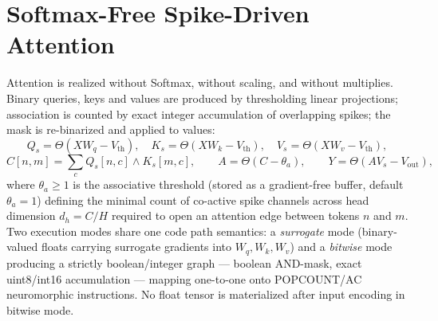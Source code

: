 \documentclass[11pt]{article}
\begin{document}
\section{Softmax-Free Spike-Driven Attention}
Attention is realized without Softmax, without scaling, and without
multiplies. Binary queries, keys and values are produced by thresholding
linear projections; association is counted by exact integer accumulation of
overlapping spikes; the mask is re-binarized and applied to values:
\begin{equation}
Q_s = \Theta(X W_q - V_{\text{th}}),\quad
K_s = \Theta(X W_k - V_{\text{th}}),\quad
V_s = \Theta(X W_v - V_{\text{th}}),
\end{equation}
\begin{equation}
C[n,m] = \sum_c Q_s[n,c] \wedge K_s[m,c], \qquad
A = \Theta(C - \theta_a), \qquad
Y = \Theta(A V_s - V_{\text{out}}),
\end{equation}
where $\theta_a \ge 1$ is the associative threshold (stored as a gradient-free buffer, default $\theta_a = 1$) defining the minimal count of co-active spike channels across head dimension $d_h = C/H$ required to open an attention edge between tokens $n$ and $m$.
Two execution modes share one code path semantics: a \emph{surrogate} mode
(binary-valued floats carrying surrogate gradients into $W_q,W_k,W_v$) and
a \emph{bitwise} mode producing a strictly boolean/integer graph --- boolean
AND-mask, exact uint8/int16 accumulation --- mapping one-to-one onto
POPCOUNT/AC neuromorphic instructions. No float tensor is materialized after
input encoding in bitwise mode.
\end{document}
